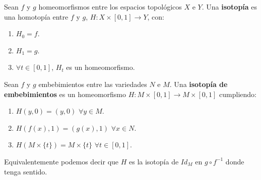 \begin{definicion} Sean $f$ y $g$ homeomorfismos entre los espacios topológicos $X$ e $Y$. Una \textbf{isotopía} es una homotopía entre $f$ y $g$, $H: X \times [0,1] \rightarrow Y$, con:
	\begin{enumerate}
		\item $H_0 = f$.
		\item $H_1 = g$.
		\item $\forall t \in [0,1]$, $H_t$ es un homeomorfismo.
	\end{enumerate}
\end{definicion}

\begin{definicion} Sean $f$ y $g$ embebimientos entre las variedades $N$ e $M$. Una \textbf{isotopía de embebimientos} es un homeomorfismo $H: M \times [0,1] \rightarrow M \times [0,1]$ cumpliendo:
	\begin{enumerate}
		\item $H(y, 0) = (y, 0)$ $\forall y \in M$.
		\item $H(f(x), 1) = (g(x), 1)$ $\forall x \in N$.
		\item $H(M \times \{t\}) = M \times \{t\}$ $\forall t \in [0,1]$.
	\end{enumerate}
	
	Equivalentemente podemos decir que $H$ es la isotopía de $Id_M$ en $g \circ f^{-1}$ donde tenga sentido.
\end{definicion}


\endinput
